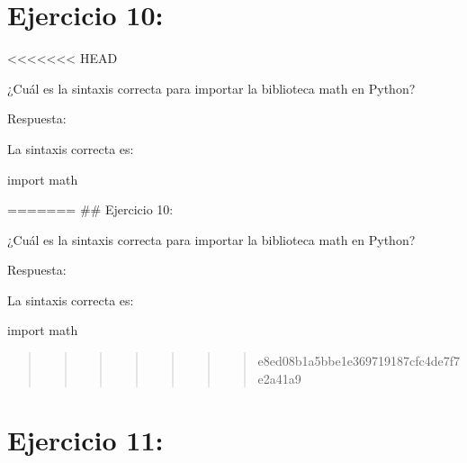 \documentclass[
  a4paper,
  DIV=11,
  numbers=noendperiod,
  onepage,
  openany]{scrreprt}
\newenvironment{Shaded}{\begin{snugshade}}{\end{snugshade}}
\newcommand{\ImportTok}[1]{\textcolor[rgb]{0.00,0.46,0.62}{#1}}
\newcommand{\NormalTok}[1]{\textcolor[rgb]{0.00,0.23,0.31}{#1}}
\begin{document}
\hypertarget{ejercicio-10}{%
\chapter{Ejercicio 10:}\label{ejercicio-10}}

\textless\textless\textless\textless\textless\textless\textless{} HEAD

¿Cuál es la sintaxis correcta para importar la biblioteca math en
Python?

Respuesta:

La sintaxis correcta es:

\begin{Shaded}
\begin{Highlighting}[]
\ImportTok{import}\NormalTok{ math}
\end{Highlighting}
\end{Shaded}

======= \#\# Ejercicio 10:

¿Cuál es la sintaxis correcta para importar la biblioteca math en
Python?

Respuesta:

La sintaxis correcta es:

\begin{Shaded}
\begin{Highlighting}[]
\ImportTok{import}\NormalTok{ math}
\end{Highlighting}
\end{Shaded}

\begin{quote}
\begin{quote}
\begin{quote}
\begin{quote}
\begin{quote}
\begin{quote}
\begin{quote}
e8ed08b1a5bbe1e369719187cfc4de7f7e2a41a9
\end{quote}
\end{quote}
\end{quote}
\end{quote}
\end{quote}
\end{quote}
\end{quote}

\hypertarget{ejercicio-11}{%
\chapter{Ejercicio 11:}\label{ejercicio-11}}
\end{document}
